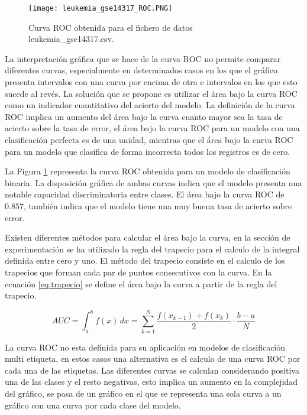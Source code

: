 \bigbreak

\begin{figure}[htp]
    \centering
    \texttt{[image: leukemia\_gse14317\_ROC.PNG]}
    \caption{Curva ROC obtenida para el fichero de datos leukemia\_gse14317.csv.}
    \label{fig:5}
\end{figure}



La interpretación gráfica que se hace de la curva ROC no permite comparar diferentes curvas, especialmente en determinados casos en los que el gráfico presenta intervalos con una curva por encima de otra e intervalos en los que esto sucede al revés. La solución que se propone es utilizar el área bajo la curva ROC como un indicador cuantitativo del acierto del modelo. La definición de la curva ROC implica un aumento del área bajo la curva cuanto mayor sea la tasa de acierto sobre la tasa de error, el área bajo la curva ROC para un modelo con una clasificación perfecta es de una unidad, mientras que el área bajo la curva ROC para un modelo que clasifica de forma incorrecta todos los registros es de cero.

\bigbreak

La Figura \ref{fig:5} representa la curva ROC obtenida para un modelo de clasificación binaria. La disposición gráfica de ambas curvas indica que el modelo presenta una notable capacidad discriminatoria entre clases. El área bajo la curva ROC de $0.857$, también indica que el modelo tiene una muy buena tasa de acierto sobre error.

\bigbreak

Existen diferentes métodos para calcular el área bajo la curva, en la sección de experimentación se ha utilizado la regla del trapecio para el calculo de la integral definida entre cero y uno. El método del trapecio consiste en el calculo de los trapecios que forman cada par de puntos consecutivos con la curva. En la ecuación \ref{eq:trapecio} se define el área bajo la curva a partir de la regla del trapecio.

\bigbreak

\begin{equation}
    AUC = \int_{a}^{b} f(x) \,dx = \sum_{k=1}^{N} \frac{f(x_{k-1})+f(x_{k})}{2} \cdot \frac{b-a}{N}
    \label{eq:trapecio}
\end{equation}

\bigbreak

La curva ROC no esta definida para su aplicación en modelos de clasificación multi etiqueta, en estos casos una alternativa es el calculo de una curva ROC por cada una de las etiquetas. Las diferentes curvas se calculan considerando positiva una de las clases y el resto negativas, esto implica un aumento en la complejidad del gráfico, se pasa de un gráfico en el que se representa una sola curva a un gráfico con una curva por cada clase del modelo.


